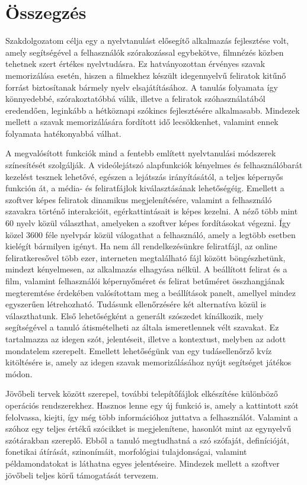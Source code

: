 \chapter*{Összegzés}

Szakdolgozatom célja egy a nyelvtanulást elősegítő alkalmazás fejlesztése volt, amely segítségével a felhasználók szórakozással egybekötve, filmnézés közben tehetnek szert értékes nyelvtudásra. Ez hatványozottan érvényes szavak memorizálása esetén, hiszen a filmekhez készült idegennyelvű feliratok kitűnő forrást biztosítanak bármely nyelv elsajátításához. A tanulás folyamata így könnyedebbé, szórakoztatóbbá válik, illetve a feliratok szóhasználatából eredendően, leginkább a hétköznapi szókincs fejlesztésére alkalmasabb. Mindezek mellett a szavak memorizálására fordított idő lecsökkenhet, valamint ennek folyamata hatékonyabbá válhat. 

A megvalósított funkciók mind a fentebb említett nyelvtanulási módszerek színesítését szolgálják. A videólejátszó alapfunkciók kényelmes és felhasználóbarát kezelést tesznek lehetővé, egészen a lejátszás irányításától, a teljes képernyős funkción át, a média- és feliratfájlok kiválasztásának lehetőségéig. Emellett a szoftver képes feliratok dinamikus megjelenítésére, valamint a felhasználó szavakra történő interakcióit, egérkattintásait is képes kezelni. A néző több mint 60 nyelv közül választhat, amelyeken a szoftver képes fordításokat végezni. Így közel 3600 féle nyelvpár közül válogathat a felhasználó, amely a legtöbb esetben kielégít bármilyen igényt. Ha nem áll rendelkezésünkre feliratfájl, az online feliratkeresővel több ezer, interneten megtalálható fájl között böngészhetünk, mindezt kényelmesen, az alkalmazás elhagyása nélkül. A beállított felirat és a film, valamint felhasználói képernyőméret és felirat betűméret összhangjának megteremtése érdekében valósítottam meg a beállítások panelt, amellyel mindez egyszerűen létrehozható. Tudásunk ellenőrzésére két alternatíva közül is választhatunk. Első lehetőségként a generált szószedet kínálkozik, mely segítségével a tanuló átismételheti az általa ismeretlennek vélt szavakat. Ez tartalmazza az idegen szót, jelentéseit, illetve a kontextust, melyben az adott mondatelem szerepelt. Emellett lehetőségünk van egy tudásellenőrző kvíz kitöltésére is, amely az idegen szavak memorizálásához nyújt segítséget játékos módon.

Jövőbeli tervek között szerepel, további telepítőfájlok elkészítése különböző operációs rendszerekhez. Hasznos lenne egy új funkció is, amely a kattintott szót felolvassa, kiejti, így még több információhoz juttatva a felhasználót. Valamint a szóhoz egy teljes értékű szócikket is megjelenítene, hasonlót mint az egynyelvű szótárakban szereplő. Ebből a tanuló megtudhatná a szó szófaját, definícióját, fonetikai átírását, szinonímáit, morfológiai tulajdonságai, valamint példamondatokat is láthatna egyes jelentéseire. Mindezek mellett a szoftver jövőbeli teljes körű támogatását tervezem.
